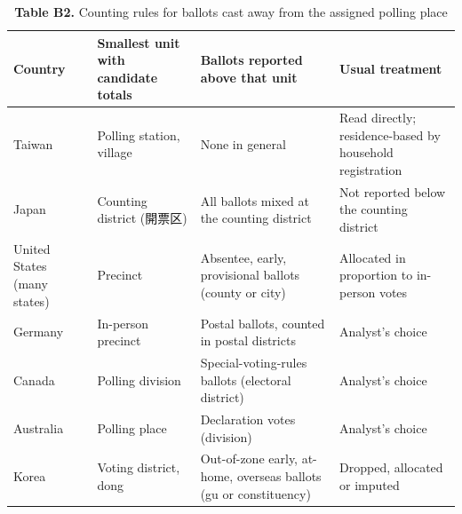 \begin{table}[!htbp]
\centering
\scriptsize
\setlength{\tabcolsep}{3.5pt}
\caption*{\textbf{Table B2.} Counting rules for ballots cast away from the assigned polling place}
\begin{tabularx}{\linewidth}{lLLL}
\toprule
Country & Smallest unit with candidate totals & Ballots reported above that unit & Usual treatment \\
\midrule
Taiwan & Polling station, village & None in general & Read directly; residence-based by household registration \\
Japan & Counting district (開票区) & All ballots mixed at the counting district & Not reported below the counting district \\
United States (many states) & Precinct & Absentee, early, provisional ballots (county or city) & Allocated in proportion to in-person votes \\
Germany & In-person precinct & Postal ballots, counted in postal districts & Analyst's choice \\
Canada & Polling division & Special-voting-rules ballots (electoral district) & Analyst's choice \\
Australia & Polling place & Declaration votes (division) & Analyst's choice \\
Korea & Voting district, dong & Out-of-zone early, at-home, overseas ballots (gu or constituency) & Dropped, allocated or imputed \\
\bottomrule
\end{tabularx}

\end{table}
